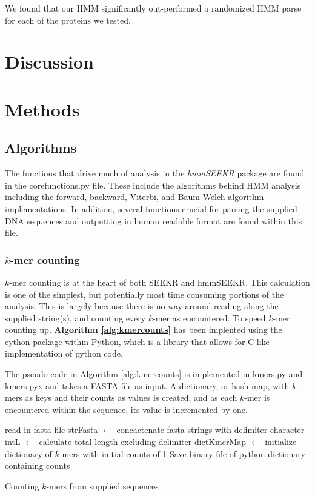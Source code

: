 We found that our HMM significantly out-performed a randomized HMM parse for each of the proteins we tested. 

\section{Discussion}
\lipsum[1-2]
\section{Methods}
\subsection{Algorithms}
The functions that drive much of analysis in the \emph{hmmSEEKR} package are found in the corefunctions.py file. These include the algorithms behind HMM analysis including the forward, backward, Viterbi, and Baum-Welch algorithm implementations. In addition, several functions crucial for parsing the supplied DNA sequences and outputting in human readable format are found within this file.

\subsubsection{$k$-mer counting}
$k$-mer counting is at the heart of both SEEKR and hmmSEEKR. This calculation is one of the simplest, but potentially most time consuming portions of the analysis. This is largely because there is no way around reading along the supplied string(s), and counting every $k$-mer as encountered. To speed $k$-mer counting up, \textbf{Algorithm \ref{alg:kmercounts}} has been implented using the cython package within Python, which is a library that allows for C-like implementation of python code.

The pseudo-code in Algorithm \ref{alg:kmercounts} is implemented in kmers.py and kmers.pyx and takes a FASTA file as input. A dictionary, or hash map, with $k$-mers as keys and their counts as values is created, and as each $k$-mer is encountered within the sequence, its value is incremented by one.

\begin{algorithm}[h]
\DontPrintSemicolon
{}
\SetAlgoLined
{}
 read in fasta file\;
 strFasta $\leftarrow$ concactenate fasta strings with delimiter character\;
 intL $\leftarrow$ calculate total length excluding delimiter\;
 dictKmerMap $\leftarrow$ initialize dictionary of $k$-mers with initial counts of 1\;
 Save binary file of python dictionary containing counts
 \caption{Counting $k$-mers from supplied sequences}
 \label{alg:kmercounts}
\end{algorithm}

